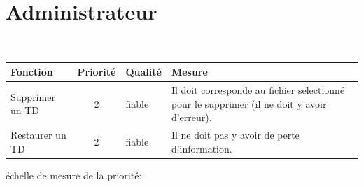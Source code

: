\section*{Administrateur}

\begin{center}
\\
\end{center}

\begin{tabular}{|p{4cm}|c|p{4cm}|p{5cm}|}
\hline
Fonction & Priorit{\'e} & Qualit{\'e} & Mesure \\
\hline
Supprimer un TD & 2 & fiable & Il doit corresponde au fichier selectionn{\'e} pour le supprimer (il ne doit y avoir d'erreur).\\
\hline
Restaurer un TD & 2 & fiable & Il ne doit pas y avoir de perte d'information.\\
\hline
\end{tabular}

\begin{center}
{\'e}chelle de mesure de la priorit{\'e}:

\end{center}


